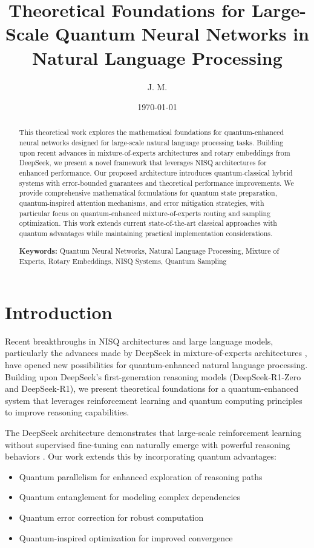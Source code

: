 \documentclass{article}
\title{Theoretical Foundations for Large-Scale Quantum Neural Networks in Natural Language Processing}
\author{J. M.}
\date{\today}
\begin{document}
\maketitle

\begin{abstract}
This theoretical work explores the mathematical foundations for quantum-enhanced neural networks designed for large-scale natural language processing tasks. Building upon recent advances in mixture-of-experts architectures and rotary embeddings from DeepSeek, we present a novel framework that leverages NISQ architectures for enhanced performance. Our proposed architecture introduces quantum-classical hybrid systems with error-bounded guarantees and theoretical performance improvements. We provide comprehensive mathematical formulations for quantum state preparation, quantum-inspired attention mechanisms, and error mitigation strategies, with particular focus on quantum-enhanced mixture-of-experts routing and sampling optimization. This work extends current state-of-the-art classical approaches with quantum advantages while maintaining practical implementation considerations.

\textbf{Keywords:} Quantum Neural Networks, Natural Language Processing, Mixture of Experts, Rotary Embeddings, NISQ Systems, Quantum Sampling
\end{abstract}

\section{Introduction}
Recent breakthroughs in NISQ architectures and large language models, particularly the advances made by DeepSeek in mixture-of-experts architectures \cite{DeepSeek2024}, have opened new possibilities for quantum-enhanced natural language processing. Building upon DeepSeek's first-generation reasoning models (DeepSeek-R1-Zero and DeepSeek-R1), we present theoretical foundations for a quantum-enhanced system that leverages reinforcement learning and quantum computing principles to improve reasoning capabilities.

The DeepSeek architecture demonstrates that large-scale reinforcement learning without supervised fine-tuning can naturally emerge with powerful reasoning behaviors \cite{DeepSeek2024}. Our work extends this by incorporating quantum advantages:

\begin{itemize}
\item Quantum parallelism for enhanced exploration of reasoning paths
\item Quantum entanglement for modeling complex dependencies
\item Quantum error correction for robust computation
\item Quantum-inspired optimization for improved convergence
\end{itemize}
\end{document}
